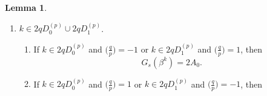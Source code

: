 \documentclass{mcom-l}
\theoremstyle{definition}
\newtheorem{sec3lemma8}[sec3lemma1]{Lemma}
\numberwithin{equation}{section}
\begin{document}
\begin{sec3lemma8}
\begin{enumerate}
\begin{enumerate}
     \item If $ k\in 2D^{(T)}_{0} $ and $ (k_{1},\ k_{2})\in D^{(p)}_{1}\times D^{(q)}_{1} $ and $ \bigl(\tfrac{p}{q}\bigr)=\bigl(\tfrac{q}{p}\bigr) $, then
     \begin{equation*}
     G_{s}(\beta^{k})=2(A_{0}B_{1}+A_{1}B_{0}+A_{0}+B_{0}).
     \end{equation*}
     \item If $ k\in 2D^{(T)}_{1} $ and $ (k_{1},\ k_{2})\in D^{(p)}_{0}\times D^{(q)}_{1} $ and $ \bigl(\tfrac{p}{q}\bigr)=-\bigl(\tfrac{q}{p}\bigr) $, then
     \begin{equation*}
     G_{s}(\beta^{k})=2(A_{0}B_{1}+A_{1}B_{0}+A_{1}+B_{0}).
     \end{equation*}
     \item If $ k\in 2D^{(T)}_{1} $ and $ (k_{1},\ k_{2})\in D^{(p)}_{0}\times D^{(q)}_{1} $ and $ \bigl(\tfrac{p}{q}\bigr)=\bigl(\tfrac{q}{p}\bigr) $, then
     \begin{equation*}
     G_{s}(\beta^{k})=2(A_{0}B_{0}+A_{1}B_{1}+A_{1}+B_{0}).
     \end{equation*}
     \item If $ k\in 2D^{(T)}_{1} $ and $ (k_{1},\ k_{2})\in D^{(p)}_{1}\times D^{(q)}_{0} $ and $ \bigl(\tfrac{p}{q}\bigr)=-\bigl(\tfrac{q}{p}\bigr) $, then
     \begin{equation*}
     G_{s}(\beta^{k})=2(A_{0}B_{1}+A_{1}B_{0}+A_{0}+B_{1}).
     \end{equation*}
     \item If $ k\in 2D^{(T)}_{1} $ and $ (k_{1},\ k_{2})\in D^{(p)}_{1}\times D^{(q)}_{0} $ and $ \bigl(\tfrac{p}{q}\bigr)=\bigl(\tfrac{q}{p}\bigr) $, then
     \begin{equation*}
     G_{s}(\beta^{k})=2(A_{0}B_{0}+A_{1}B_{1}+A_{0}+B_{1}).
     \end{equation*}
     \end{enumerate}
     \item $ k\in 2qD_{0}^{(p)}\cup 2qD_{1}^{(p)} $.
     \begin{enumerate}
     \item
     If $ k\in 2qD_{0}^{(p)} $ and $ \bigl(\tfrac{q}{p}\bigr)=-1 $ or $ k\in 2qD_{1}^{(p)} $ and $ \bigl(\tfrac{q}{p}\bigr)=1 $, then
     \begin{equation*}
     G_{s}(\beta^{k})=2A_{0}.
     \end{equation*}
     \item
     If $ k\in 2qD_{0}^{(p)} $ and $ \bigl(\tfrac{q}{p}\bigr)=1 $ or $ k\in 2qD_{1}^{(p)} $ and $ \bigl(\tfrac{q}{p}\bigr)=-1 $, then

\end{enumerate}
\end{enumerate}
\end{sec3lemma8}
\end{document}
